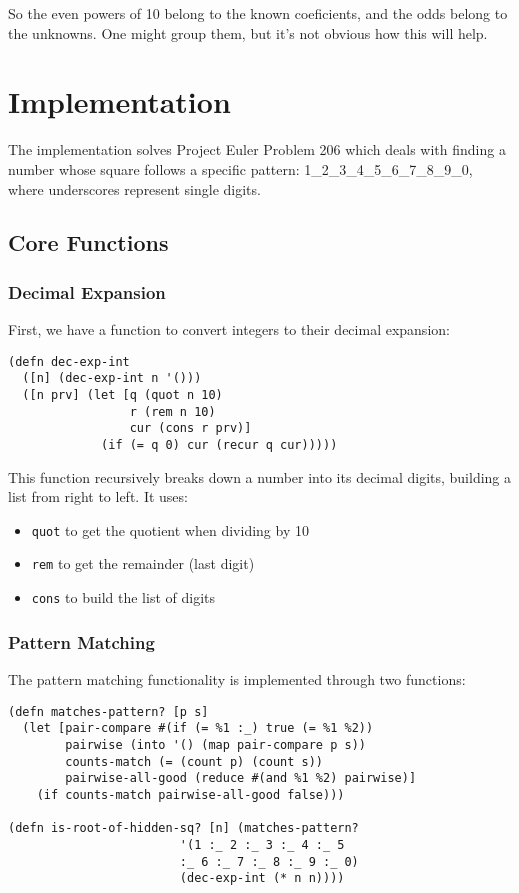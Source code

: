 \documentclass{article}
\begin{document}
So the even powers of 10 belong to the known coeficients, and the odds belong to the unknowns.  One might group
them, but it's not obvious how this will help.

\section{Implementation}

The implementation solves Project Euler Problem 206 which deals with finding a number whose square follows a specific pattern: 1_2_3_4_5_6_7_8_9_0, where underscores represent single digits.

\subsection{Core Functions}

\subsubsection{Decimal Expansion}
First, we have a function to convert integers to their decimal expansion:

\begin{lstlisting}
(defn dec-exp-int
  ([n] (dec-exp-int n '()))
  ([n prv] (let [q (quot n 10) 
                 r (rem n 10) 
                 cur (cons r prv)]
             (if (= q 0) cur (recur q cur)))))
\end{lstlisting}

This function recursively breaks down a number into its decimal digits, building a list from right to left. It uses:
\begin{itemize}
    \item \texttt{quot} to get the quotient when dividing by 10
    \item \texttt{rem} to get the remainder (last digit)
    \item \texttt{cons} to build the list of digits
\end{itemize}

\subsubsection{Pattern Matching}
The pattern matching functionality is implemented through two functions:

\begin{lstlisting}
(defn matches-pattern? [p s]
  (let [pair-compare #(if (= %1 :_) true (= %1 %2))
        pairwise (into '() (map pair-compare p s))
        counts-match (= (count p) (count s))
        pairwise-all-good (reduce #(and %1 %2) pairwise)]
    (if counts-match pairwise-all-good false)))

(defn is-root-of-hidden-sq? [n] (matches-pattern?
                        '(1 :_ 2 :_ 3 :_ 4 :_ 5 
                        :_ 6 :_ 7 :_ 8 :_ 9 :_ 0)
                        (dec-exp-int (* n n))))
\end{lstlisting}
\end{document}
